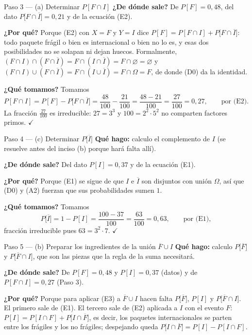 \documentclass[11pt]{article}
\begin{document}
\begin{sol}
\begin{paso}{Paso 3 --- (a) Determinar $P[F\cap I]$}
\textbf{¿De dónde sale?} De $P[F]=0{,}48$, del dato $P\big[F\cap\overline{I}\big]=0{,}21$ y de la
ecuación (E2).

\textbf{¿Por qué?} Porque (E2) con $X=F$ y $Y=I$ dice
$P[F]=P[F\cap I]+P\big[F\cap\overline{I}\big]$: todo paquete frágil o bien es internacional o
bien no lo es, y esas dos posibilidades no se solapan ni dejan huecos. Formalmente,
$(F\cap I)\cap(F\cap\overline{I})=F\cap(I\cap\overline{I})=F\cap\varnothing=\varnothing$ y
$(F\cap I)\cup(F\cap\overline{I})=F\cap(I\cup\overline{I})=F\cap\Omega=F$, de donde (D0) da la
identidad.

\textbf{¿Qué tomamos?} Tomamos
\[
P[F\cap I]=P[F]-P\big[F\cap\overline{I}\big]
=\frac{48}{100}-\frac{21}{100}=\frac{48-21}{100}=\frac{27}{100}=0{,}27 , \qquad\text{por (E2)} .
\]
La fracción $\frac{27}{100}$ es irreducible: $27=3^{3}$ y $100=2^{2}\cdot 5^{2}$ no comparten
factores primos. $\checkmark$
\end{paso}

\begin{paso}{Paso 4 --- (c) Determinar $P\big[\overline{I}\big]$}
\textbf{Qué hago:} calculo el complemento de $I$ (se resuelve antes del inciso (b) porque hará
falta allí).

\textbf{¿De dónde sale?} Del dato $P[I]=0{,}37$ y de la ecuación (E1).

\textbf{¿Por qué?} Porque (E1) se sigue de que $I$ e $\overline{I}$ son disjuntos con unión
$\Omega$, así que (D0) y (A2) fuerzan que sus probabilidades sumen $1$.

\textbf{¿Qué tomamos?} Tomamos
\[
P\big[\overline{I}\big]=1-P[I]=\frac{100-37}{100}=\frac{63}{100}=0{,}63 , \qquad\text{por (E1)} ,
\]
fracción irreducible pues $63=3^{2}\cdot 7$. $\checkmark$
\end{paso}

\begin{paso}{Paso 5 --- (b) Preparar los ingredientes de la unión $\overline{F}\cup I$}
\textbf{Qué hago:} calculo $P\big[\overline{F}\big]$ y $P\big[\overline{F}\cap I\big]$, que son
las piezas que la regla de la suma necesitará.

\textbf{¿De dónde sale?} De $P[F]=0{,}48$ y $P[I]=0{,}37$ (datos) y de $P[F\cap I]=0{,}27$
(Paso 3).

\textbf{¿Por qué?} Porque para aplicar (E3) a $\overline{F}\cup I$ hacen falta
$P\big[\overline{F}\big]$, $P[I]$ y $P\big[\overline{F}\cap I\big]$. El primero sale de (E1). El
tercero sale de (E2) aplicada a $I$ con el evento $F$: $P[I]=P[I\cap F]+P\big[I\cap\overline{F}\big]$,
es decir, los paquetes internacionales se parten entre los frágiles y los no frágiles;
despejando queda $P\big[I\cap\overline{F}\big]=P[I]-P[I\cap F]$.


\end{paso}
\end{sol}
\end{document}
